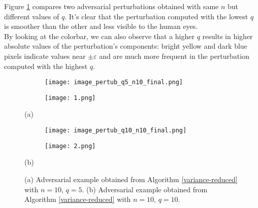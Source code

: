 Figure \ref{fig:vred} compares two adversarial perturbations obtained with same $n$ but different values of $q$. It's clear that the perturbation computed with the lowest $q$ is smoother than the other and less visible to the human eyes.\\
\indent By looking at the colorbar, we can also observe that a higher $q$ results in higher absolute values of the perturbation's components: bright yellow and dark blue pixels indicate values near $\pm\varepsilon$ and are much more frequent in the perturbation computed with the highest $q$.

\begin{figure}[h]
	\begin{subfigure}[b]{0.15\textwidth}
		\texttt{[image: image\_pertub\_q5\_n10\_final.png]}
	\end{subfigure}
	\hspace{2.5cm}
	\begin{subfigure}[b]{0.15\textwidth}
		\texttt{[image: 1.png]}
	\end{subfigure}
	\newline
	\centerline{(a)}
	\begin{subfigure}[b]{0.15\textwidth}
		\texttt{[image: image\_pertub\_q10\_n10\_final.png]}
	\end{subfigure}
	\hspace{2.5cm}
	\begin{subfigure}[b]{0.15\textwidth}
		\texttt{[image: 2.png]}
	\end{subfigure}
	\newline
	\centerline{(b)}
	\caption{{\small (a) Adversarial example obtained from Algorithm \ref{variance-reduced} with $n=10$, $q=5$. (b) Adversarial example obtained from Algorithm \ref{variance-reduced} with $n=10$, $q=10$.}  }
	\label{fig:vred}
\end{figure}
